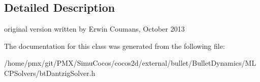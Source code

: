 \subsection{Detailed Description}
original version written by Erwin Coumans, October 2013 

The documentation for this class was generated from the following file\+:\begin{DoxyCompactItemize}
\item 
/home/pmx/git/\+P\+M\+X/\+Simu\+Cocos/cocos2d/external/bullet/\+Bullet\+Dynamics/\+M\+L\+C\+P\+Solvers/bt\+Dantzig\+Solver.\+h\end{DoxyCompactItemize}
